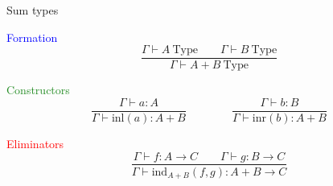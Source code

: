 \documentclass[usenames,dvipsnames]{beamer}
\newcommand{\blu}[1]{\textcolor{blue}{#1}}
\newcommand{\gre}[1]{\textcolor{ForestGreen}{#1}}
\newcommand{\red}[1]{\textcolor{red}{#1}}
\begin{document}
    \begin{frame}{Sum types}
        \begin{block}{\blu{Formation}}
            $$\frac{\Gamma \vdash A\ \text{Type}\qquad \Gamma \vdash B\ \text{Type} }{\Gamma \vdash A + B\ \text{Type}}$$
        \end{block}
        
        \begin{block}{\gre{Constructors}}
            $$\frac{\Gamma \vdash a : A}{\Gamma \vdash \text{inl}(a) : A + B} \qquad\qquad
              \frac{\Gamma \vdash b : B}{\Gamma \vdash \text{inr}(b) : A + B}$$
        \end{block}
        
        \begin{block}{\red{Eliminators}}
            $$\frac
                {\Gamma \vdash f : A \to C \qquad \Gamma \vdash g : B \to C}
                {\Gamma \vdash \text{ind}_{A+B}(f, g) : A + B \to C}$$
        \end{block}
        
    \end{frame}
    
    
\end{document}
